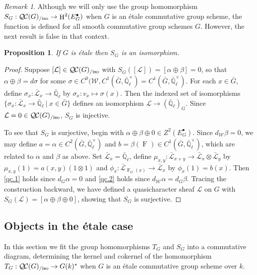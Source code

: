 \documentclass[CM,Submssn,SecEq]{degruyter-crelle} %
\theoremstyle{plain}
\newtheorem{proposition}[theorem]{Proposition}
\theoremstyle{definition}
\theoremstyle{remark}
\newtheorem{remark}[theorem]{Remark}
\newcommand{\EE}{\mathbb{\bar Q}_\ell}
\newcommand{\Fq}{k}
\newcommand{\EEx}{\EE^\times}
\newcommand{\Weil}[1]{\mathcal{W}_{#1}}
\newcommand{\Frob}[1]{\operatorname{F}_{#1}}
\DeclareMathOperator{\Hh}{H}
\newcommand{\tq}{{\ \vert\ }}
\newcommand{\TrFrob}[1]{T_{#1}}
\newcommand{\qcs}[1]{{\mathcal{#1}}}
\newcommand{\gqcs}[1]{{\mathcal{\bar #1}}}
\newcommand{\QC}{{\mathcal{Q\hskip-0.8pt C}}}
\newcommand{\QCiso}[1]{\QC(#1)_{/\text{iso}}}
\begin{document}
\begin{remark}
Although we will only use the group homomorphism $S_G : \QCiso{G}\to \Hh^2(E^\bullet_G)$ when $G$ is an \'etale commutative group scheme, the function is defined for all smooth commutative group schemes $G$.
However, the next result is false in that context.
\end{remark}

\begin{proposition}\label{prop:SGiso}
If $G$ is \'etale then $S_G$ is an isomorphism.
\end{proposition}
\begin{proof}
Suppose $[\qcs{L}] \in \QCiso{G}$ with $S_G([\qcs{L}]) = [\alpha \oplus \beta] = 0$,
so that $\alpha \oplus \beta = d\sigma$ for some $\sigma \in C^0(\Weil{},C^1({\bar G},\EEx) = C^1({\bar G},\EEx)$.
For each $x\in {\bar G}$, define $\sigma_x : \gqcs{L}_x \to \EE$ by $\sigma_x : v_x \mapsto \sigma(x)$.
Then the indexed set of isomorphisms $\{ \sigma_x : \gqcs{L}_x \to \EE \tq x\in {\bar G}\}$
defines an isomorphism $\qcs{L} \to (\EE)_G$.
Since $\qcs{L} = 0 \in \QCiso{G}$, $S_G$ is injective.

To see that $S_G$ is surjective, begin with $\alpha\oplus\beta\oplus 0 \in Z^2(E^\bullet_G)$.
Since $d_{\Weil{}} \beta = 0$, we may define $a = \alpha \in C^2({\bar G},\EEx)$ and
$b = \beta(\Frob{}) \in C^1({\bar G},\EEx)$, which are related to $\alpha$ and $\beta$ as above.
Set $\gqcs{L}_x = \EE$, define $\mu_{x,y} : \gqcs{L}_{x+y} \to \gqcs{L}_x\otimes\gqcs{L}_y$
by $\mu_{x,y}(1) = a(x,y) (1\otimes 1)$ and $\phi_x : \gqcs{L}_{\Frob{G}(x)} \to \gqcs{L}_x$ by $\phi_x(1)= b(x)$.
Then \ref{qc.1} holds since $d_G \alpha =0$ and \ref{qc.2} holds since $d_{\Weil{}}\alpha =d_G \beta$.
Tracing the construction backward, we have defined a quasicharacter sheaf $\qcs{L}$ on $G$ with
$S_G(\qcs{L}) = [\alpha\oplus\beta\oplus 0]$, showing that $S_G$ is surjective.
\end{proof}

\subsection{Objects in the \'etale case}\label{ssec:SandT}

In this section we fit the group homomorphisms $\TrFrob{G}$ and $S_G$ into a commutative diagram, determining the kernel and cokernel of the homomorphism $\TrFrob{G} : \QCiso{G} \to G(k)^*$ when $G$ is an \'etale commutative group scheme over $\Fq$.
\end{document}
